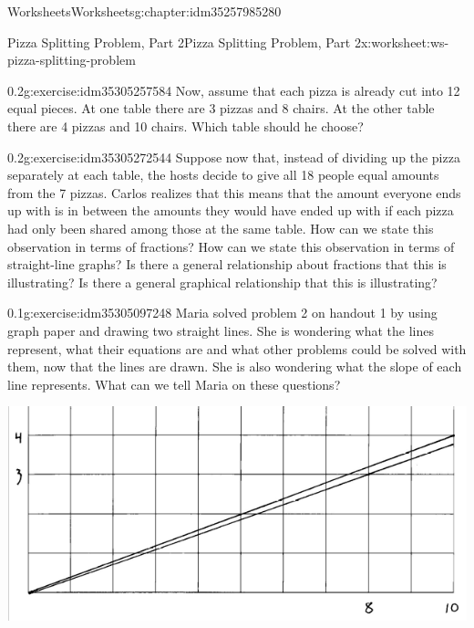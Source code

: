 \documentclass[twoside,11pt,]{book}
\begin{document}
\begin{chapterptx}{Worksheets}{}{Worksheets}{}{}{g:chapter:idm35257985280}
\begin{worksheet-section-numberless}{Pizza Splitting Problem, Part 2}{}{Pizza Splitting Problem, Part 2}{}{}{x:worksheet:ws-pizza-splitting-problem}
\begin{divisionexercise}{1}{}{0.2}{g:exercise:idm35305257584}%
Now, assume that each pizza is already cut into 12 equal pieces. At one table there are 3 pizzas and 8 chairs.  At the other table there are 4 pizzas and 10 chairs.  Which table should he choose?%
\end{divisionexercise}%
\begin{divisionexercise}{2}{}{0.2}{g:exercise:idm35305272544}%
Suppose now that, instead of dividing up the pizza separately at each table, the hosts decide to give all 18 people equal amounts from the 7 pizzas.  Carlos realizes that this means that the amount everyone ends up with is in between the amounts they would have ended up with if each pizza had only been shared among those at the same table.  How can we state this observation in terms of fractions?  How can we state this observation in terms of straight-line graphs?  Is there a general relationship about fractions that this is illustrating?  Is there a general graphical relationship that this is illustrating?%
\end{divisionexercise}%
\clearpage
\begin{divisionexercise}{3}{}{0.1}{g:exercise:idm35305097248}%
Maria solved problem 2 on handout 1 by using graph paper and drawing two straight lines.  She is wondering what the lines represent, what their equations are and what other problems could be solved with them, now that the lines are drawn.  She is also wondering what the slope of each line represents.  What can we tell Maria on these questions?%
\begin{sidebyside}{1}{0.05}{0.05}{0}%
\begin{sbspanel}{0.9}%
\includegraphics[width=1\linewidth]{images/pizza-splitting-problem.png}

\end{sbspanel}
\end{sidebyside}
\end{divisionexercise}
\end{worksheet-section-numberless}
\end{chapterptx}
\end{document}
